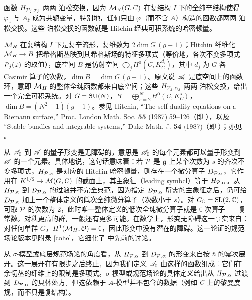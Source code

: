 函数 $H_{\P_j,\alpha_j}$ 两两 泊松交换，因为 $\M_H(G,C)$ 在复结构 $I$ 下的全纯辛结构使得 $\varphi_z$ 与 $A_{\bar z}$ 成为共轭变量，特别地，任何只由 $\varphi$（而不含 $A$）构造的函数都两两 泊松交换。这些 泊松交换的函数就是 Hitchin 经典可积系统的哈密顿量。

\begin{yizhu}
$\M_H$ 在复结构 $I$ 下是复辛流形，复维数为 $2\dim G\,(g-1)$；Hitchin 纤维化 $\M_H\to B$ 把希格斯丛映到其希格斯场的特征多项式（等价地，各次不变多项式 $\P_j(\varphi)$ 的取值），底空间 $B$ 是仿射空间 $\bigoplus_{j}H^0(C,K_C^{d_j})$，其中 $d_j$ 为 $G$ 各 Casimir 算子的次数，$\dim B=\dim G\,(g-1)$。原文说 $\A_0$ 是底空间上的函数环，意即 $\M_H$ 的整体全纯函数都来自底空间；这些 $H_{\P_j,\alpha_j}$ 两两 泊松交换，给出一个完全可积系统。对 $G=\SU(N)$，$B=\bigoplus_{s=2}^{N}H^0(C,K_C^{s})$，$\dim B=(N^2-1)(g-1)$。参见 Hitchin, ``The self-duality equations on a Riemann surface,'' Proc. London Math. Soc. {\bf 55} (1987) 59--126（即 \cite{H}），以及 ``Stable bundles and integrable systems,'' Duke Math. J. {\bf 54} (1987)（即 \cite{NH}）；亦见 \cite{BD}。
\end{yizhu}

从 $\A_0$ 到 $\A$ 的量子形变是无障碍的，意思是 $\A_0$ 的每个元素都可以量子形变到 $\A$ 的一个元素。具体地说，这句话意味着：若 $\P$ 是 $\g$ 上某个次数为 $s$ 的齐次不变多项式，$H_{\P,\alpha}$ 是对应的 Hitchin 哈密顿量，则存在一个微分算子 $D_{\P,\alpha}$，它作用在 $K^{1/2}\to \M(G,C)$ 的截面上，其主象征（leading symbol）等于 $H_{\P,\alpha}$。从 $H_{\P,\alpha}$ 到 $D_{\P,\alpha}$ 的过渡并不完全典范，因为指定 $D_{\P,\alpha}$ 所需的主象征之后，仍可给 $D_{\P,\alpha}$ 加上一个整体定义的低次全纯微分算子（次数小于 $s$）。对 $G_\C=\SL(2,\C)$，可取 $\P$ 的次数为 2，此时唯一整体定义的低次全纯微分算子就是 0 次算子——复常数。对秩更高的群，一般还有更多可能。在数学上，形变无障碍这一事实来自：对任何单群 $G$，$H^1(\M_H,\O)=0$，因此形变中没有潜在的障碍。这一论证的规范场论版本见附录 \ref{coho}，它细化了 \cite{KW} 中先前的讨论。

从 $\sigma$-模型或底层规范场论的角度看，从 $H_{\P,\alpha}$ 到 $D_{\P,\alpha}$ 的形变来自按 $\hbar$ 的幂次展开。这一展开在有限步之后终止，因为我们定义 $\A_0$ 由这样的函数组成：它们在余切丛的纤维上的限制是多项式。$\sigma$-模型或规范场论的具体定义给出从 $H_{\P,\alpha}$ 过渡到 $D_{\P,\alpha}$ 的具体处方，但这依赖于 $A$-模型并不包含的数据（例如 $C$ 上的黎曼度规，而不只是复结构）。

